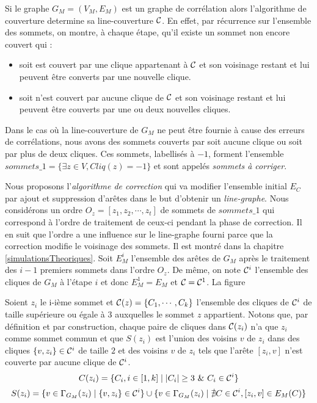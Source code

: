 Si le graphe $G_M=(V_M, E_M)$ est un graphe de corr\'elation alors l'algorithme de couverture determine sa line-couverture $\cal C$.
En effet, par r\'ecurrence sur l'ensemble des sommets, on montre, \`a chaque \'etape, qu'il existe un sommet non encore couvert qui :
\begin{itemize}
\item soit est couvert par une clique appartenant \`a $\cal C$ et son voisinage restant et lui peuvent \^etre converts par une nouvelle clique.
\item soit n'est couvert par aucune clique de  $\cal C$ et son voisinage restant et lui peuvent \^etre couverts par une ou deux nouvelles cliques.
\end{itemize}
Dans le cas o\`u la line-couverture de $G_M$ ne peut \^etre fournie \`a cause des erreurs de corr\'elations, nous avons des sommets couverts par soit aucune clique ou soit par plus de deux cliques. Ces sommets, labellis\'es \`a $-1$, forment l'ensemble 
$sommets\_1 = \{\exists z \in V, Cliq(z) = -1 \}$ 
et sont appel\'es {\em sommets \`a corriger}.
\newline

Nous proposons l'{\em algorithme de correction} qui va modifier l'ensemble initial $E_C$ par ajout et suppression d'ar\^etes dans le but d'obtenir un {\em line-graphe}.
Nous consid\'erons un ordre $O_z = [z_1, z_2, \cdots, z_t]$ de sommets de $sommets\_1$ qui correspond \`a l'ordre de traitement  de ceux-ci pendant la phase de correction.
Il en suit que l'ordre a une influence sur le line-graphe fourni parce que la correction modifie le voisinage des sommets. Il est montr\'e dans la chapitre \ref{simulationsTheoriques}.
\newline
Soit $E_M^i$ l'ensemble des ar\^etes de $G_M$ apr\`es le traitement des $i-1$ premiers sommets dans l'ordre $O_z$. De m\^eme, on note ${\cal C}^i$ l'ensemble des cliques de $G_M$ \`a l'\'etape $i$ et donc $E_M^1 = E_M$ et ${\cal C} = {\cal C}^1$.
La figure 
\newline

Soient $z_i$ le i-i\`eme sommet et ${\cal C}(z) = \{C_1, \cdots, C_k\}$ l'ensemble des cliques de ${\cal C}^i$ de taille sup\'erieure ou \'egale \`a $3$ auxquelles le sommet $z$ appartient.
Notons que, par d\'efinition et par construction, chaque paire de cliques dans ${\cal C}(z_i)$ n'a que $z_i$ comme sommet commun et que $S(z_i)$ est l'union des voisins $v$ de $z_i$ dans des cliques $\{v,z_i\} \in {\cal C}^i$ de taille $2$ et des voisins $v$ de $z_i$ tels que l'ar\^ete $[z_i,v]$ n'est couverte par aucune clique de ${\cal C}^i$.
\begin{equation}
C(z_i) = \{C_i, i \in [1,k] \mid  |C_i| \ge 3 \mbox{ } \&  \mbox{ } C_i \in {\cal C}^i \} 
\end{equation}
\begin{equation}
S(z_i) = \{v \in \Gamma_{G_M}(z_i) \mid \{v,z_i\} \in {\cal C}^i\} \cup  \{ v \in \Gamma_{G_M}(z_i) \mid \nexists C \in {\cal C}^{i} , [z_i,v] \in E_M(C) \}
\end{equation}

